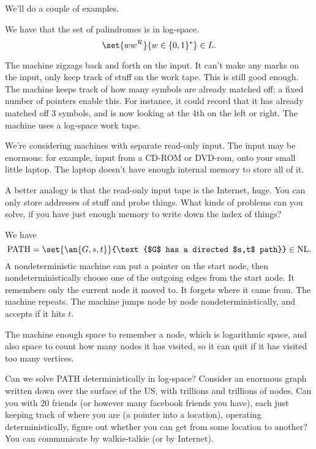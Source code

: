 \vskip0.15in

We'll do a couple of examples.
\begin{ex}
We have that the set of palindromes is in log-space.
\[
\set{ww^{\cal R}}{w\in \{0,1\}^*}\in L.
\]

The machine zigzags back and forth on the input. It can't make any marks on the input, only keep track of stuff on the work tape. This is still good enough. %
The machine keeps track of how many symbols are already matched off; a fixed number of pointers enable this. For instance, it could record that it has already matched off 3 symbols, and is now looking at the 4th on the left or right. The machine uses a log-space work tape.
\end{ex}
We're considering machines with separate read-only input. The input may be enormous: for example, input from a CD-ROM or DVD-rom, onto your small little laptop. The laptop doesn't have enough internal memory to store all of it.

A better analogy is that the read-only input tape is the Internet, huge.
You can only store addresses of stuff and probe things. What kinds of problems can you solve, if you have just enough memory to write down the index of things? 

\begin{ex}
We have
\[
\text{PATH}=\set{\an{G,s,t}}{\text{$G$ has a directed $s,t$ path}}\in \text{NL}.
\]
A nondeterministic machine can put a pointer on the start node, then nondeterministically choose one of the outgoing edges from the start node. It remembers only the current node it moved to. It forgets where it came from. The machine repeats. %
The machine jumps node by node nondeterministically, and accepts if it hits $t$. 

The machine enough space to remember a node, which is logarithmic space, and also space to count how many nodes it has visited, so it can quit if it has visited too many vertices. %
\end{ex}

Can we solve PATH deterministically in log-space? Consider an enormous graph written down over the surface of the US, with trillions and trillions of nodes. Can you with 20 friends (or however many facebook friends you have), each just keeping track of where you are (a pointer into a location), operating deterministically, figure out whether you can get from some location to another? 
You can communicate by walkie-talkie (or by Internet).

